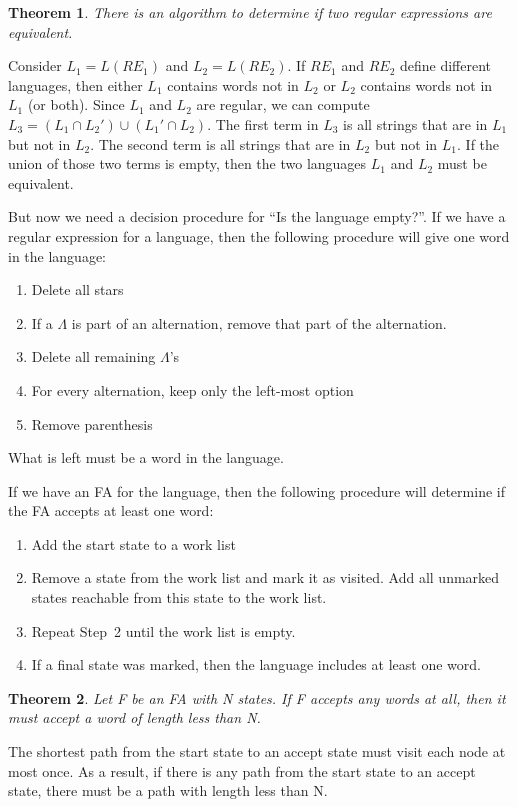 \documentclass[letterpaper,12pt,openany,reqno]{book}%
\newtheorem{theorem}{Theorem}
\begin{document}
\begin{theorem}
There is an algorithm to determine if two regular expressions are equivalent.
\end{theorem}
Consider $L_1 = L(RE_1)$ and $L_2 = L(RE_2)$. If $RE_1$ and $RE_2$ define different languages, then either $L_1$ contains words not in $L_2$ or $L_2$ contains words not in $L_1$ (or both).
Since $L_1$ and $L_2$ are regular, we can compute $L_3 = (L_1 \cap L_2') \cup (L_1' \cap L_2)$. The first term in $L_3$ is all strings that are in $L_1$ but not in $L_2$. The second term is all strings that are in $L_2$ but not in $L_1$. If the union of those two terms is empty, then the two languages $L_1$ and $L_2$ must be equivalent.

But now we need a decision procedure for ``Is the language empty?''. If we have a regular expression for a language, then the following procedure will give one word in the language:
\begin{enumerate}
\item Delete all stars
\item If a $\Lambda$ is part of an alternation, remove that part of the alternation.
\item Delete all remaining $\Lambda$'s
\item For every alternation, keep only the left-most option
\item Remove parenthesis
\end{enumerate}
What is left must be a word in the language.

If we have an FA for the language, then the following procedure will determine if the FA accepts at least one word:
\begin{enumerate}
\item Add the start state to a work list
\item Remove a state from the work list and mark it as visited. Add all unmarked states reachable from this state to the work list.
\item Repeat Step~2 until the work list is empty.
\item If a final state was marked, then the language includes at least one word.
\end{enumerate}

\begin{theorem}
\label{T.FA.length}
Let F be an FA with N states. If F accepts any words at all, then it must accept a word of length less than N.
\end{theorem}
The shortest path from the start state to an accept state must visit each node at most once. As a result, if there is any path from the start state to an accept state, there must be a path with length less than N.
\end{document}
